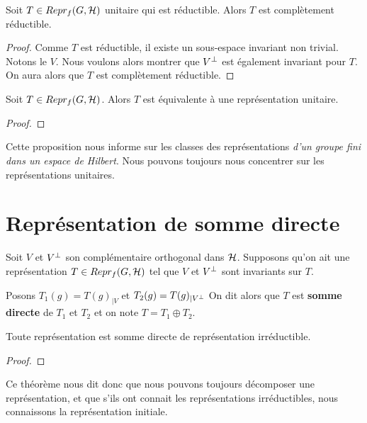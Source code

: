 \begin{proposition}
	Soit $T \in Repr_{f}(G, \mathcal{H})$ unitaire qui est réductible. Alors $T$
	est complètement réductible.
\end{proposition}

\begin{proof}
	Comme $T$ est réductible, il existe un sous-espace invariant non trivial.
	Notons le $V$.
	Nous voulons alors montrer que $V^{\perp}$ est également invariant pour
	$T$. On aura alors que $T$ est complètement réductible.
\end{proof}

\begin{proposition}
	Soit $T \in Repr_{f}(G, \mathcal{H})$. Alors $T$ est équivalente à une
	représentation unitaire.
\end{proposition}

\begin{proof}

\end{proof}

Cette proposition nous informe sur les classes des représentations \textit{d'un groupe
fini dans un espace de Hilbert}. Nous pouvons toujours nous concentrer sur les
représentations unitaires.

\section{Représentation de somme directe}

\begin{definition}
	Soit $V$ et $V^{\perp}$ son complémentaire orthogonal dans $\mathcal{H}$.
	Supposons qu'on ait une représentation $T \in Repr_{f}(G, \mathcal{H})$ tel que
	$V$ et $V^{\perp}$ sont invariants sur $T$.

	Posons $T_{1}(g) = T(g)_{|V}$ et $T_{2}(g) = T(g)_{|V^{\perp}}$
	On dit alors que $T$ est \textbf{somme directe} de $T_{1}$ et $T_{2}$ et on
	note $T = T_{1} \oplus T_{2}$.
\end{definition}


\begin{theorem}
	Toute représentation est somme directe de représentation irréductible.
\end{theorem}

\begin{proof}

\end{proof}

Ce théorème nous dit donc que nous pouvons toujours décomposer une
représentation, et que s'ils ont connait les représentations irréductibles, nous
connaissons la représentation initiale.

